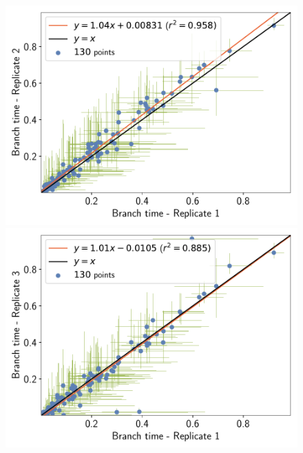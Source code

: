 \documentclass{article}
\begin{document}
	\begin{figure}[H]
		\centering
		\begin{minipage}{0.32\linewidth}
			\includegraphics[width=\linewidth, page=1]{isopods/12CDS_SiteMutSelBranchNe_Rep-1-2_BranchTime}
		\end{minipage} \hfill
		\begin{minipage}{0.32\linewidth}
			\includegraphics[width=\linewidth, page=1]{isopods/12CDS_SiteMutSelBranchNe_Rep-1-3_BranchTime}
		\end{minipage} \hfill
		\begin{minipage}{0.32\linewidth}

\end{minipage}
\end{figure}
\end{document}

